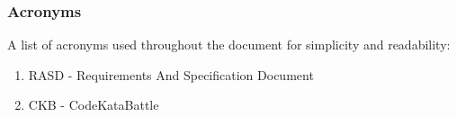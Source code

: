 \subsubsection{Acronyms}
A list of acronyms used throughout the document for simplicity and readability:
\begin{enumerate}
	\item RASD - Requirements And Specification Document
	\item CKB - CodeKataBattle
\end{enumerate}